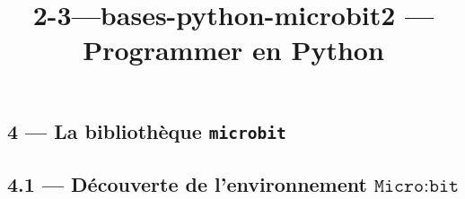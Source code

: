 \documentclass[a4paper,17pt]{extarticle}
\title{2-3---bases-python-microbit}
\begin{document}
    
    \title{2 --- Programmer en Python}

    
    

    
    \hypertarget{la-bibliothuxe8que-microbit}{%
\subsection{\texorpdfstring{4 --- La bibliothèque
\texttt{microbit}}{4 --- La bibliothèque microbit}}\label{la-bibliothuxe8que-microbit}}

    \hypertarget{duxe9couverte-de-lenvironnement-textttmicrobit}{%
\subsection{\texorpdfstring{4.1 --- Découverte de l'environnement
\(\texttt{Micro:bit}\)}{4.1 --- Découverte de l'environnement \textbackslash texttt\{Micro:bit\}}}\label{duxe9couverte-de-lenvironnement-textttmicrobit}}
\end{document}

